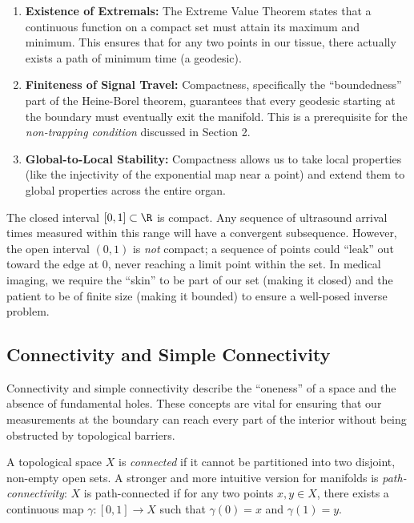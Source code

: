 \begin{enumerate}
  \item \textbf{Existence of Extremals:} The Extreme Value Theorem states that a continuous function on a compact set must attain its maximum and minimum. This ensures that for any two points in our tissue, there actually exists a path of minimum time (a geodesic).
  \item \textbf{Finiteness of Signal Travel:} Compactness, specifically the ``boundedness'' part of the Heine-Borel theorem, guarantees that every geodesic starting at the boundary must eventually exit the manifold. This is a prerequisite for the \emph{non-trapping condition} discussed in Section 2.
  \item \textbf{Global-to-Local Stability:} Compactness allows us to take local properties (like the injectivity of the exponential map near a point) and extend them to global properties across the entire organ.
\end{enumerate}

\begin{example}
  The closed interval $[0, 1] \subset \R$ is compact. Any sequence of ultrasound arrival times measured within this range will have a convergent subsequence. However, the open interval $(0, 1)$ is \emph{not} compact; a sequence of points could ``leak'' out toward the edge at $0$, never reaching a limit point within the set. In medical imaging, we require the ``skin'' to be part of our set (making it closed) and the patient to be of finite size (making it bounded) to ensure a well-posed inverse problem.
\end{example}

\subsection{Connectivity and Simple Connectivity} Connectivity and simple connectivity describe the ``oneness'' of a space and the absence of fundamental holes. These concepts are vital for ensuring that our measurements at the boundary can reach every part of the interior without being obstructed by topological barriers.

\begin{definition}
  A topological space $X$ is \emph{connected} if it cannot be partitioned into two disjoint, non-empty open sets. A stronger and more intuitive version for manifolds is \emph{path-connectivity}: $X$ is path-connected if for any two points $x, y \in X$, there exists a continuous map $\gamma: [0, 1] \to X$ such that $\gamma(0) = x$ and $\gamma(1) = y$.
\end{definition}

